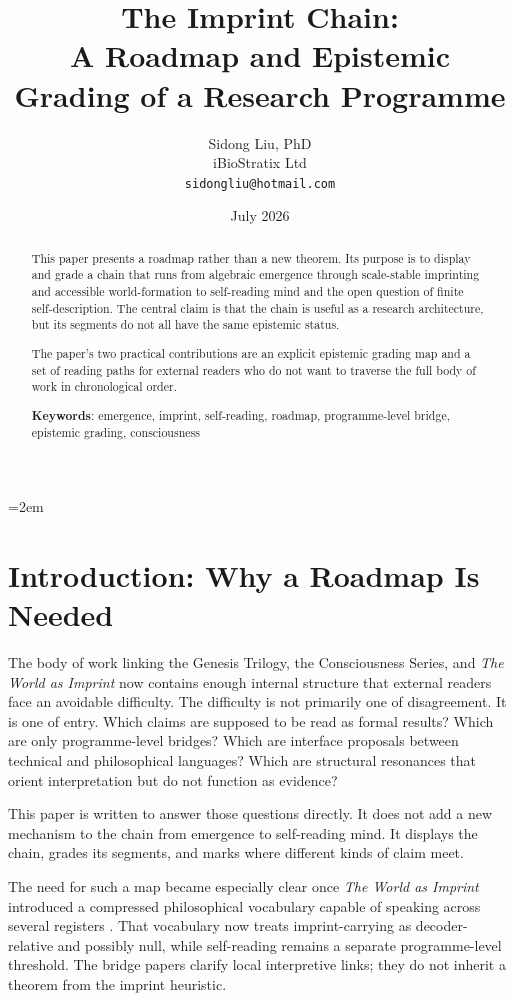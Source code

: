\documentclass[12pt,a4paper]{article}
\title{The Imprint Chain:\\
A Roadmap and Epistemic Grading of a Research Programme}
\author{
  Sidong Liu, PhD \\
  iBioStratix Ltd \\
  \texttt{sidongliu@hotmail.com}
}
\date{July 2026}
\begin{document}
\emergencystretch=2em
\raggedbottom
{}

\maketitle

\begin{abstract}
This paper presents a roadmap rather than a new theorem. Its purpose is to display and grade a chain that runs from algebraic emergence through scale-stable imprinting and accessible world-formation to self-reading mind and the open question of finite self-description. The central claim is that the chain is useful as a research architecture, but its segments do not all have the same epistemic status.

The paper's two practical contributions are an explicit epistemic grading map and a set of reading paths for external readers who do not want to traverse the full body of work in chronological order.

\medskip

\noindent\textbf{Keywords}: emergence, imprint, self-reading, roadmap, programme-level bridge, epistemic grading, consciousness
\end{abstract}

\section{Introduction: Why a Roadmap Is Needed}

The body of work linking the Genesis Trilogy, the Consciousness Series, and \emph{The World as Imprint} now contains enough internal structure that external readers face an avoidable difficulty. The difficulty is not primarily one of disagreement. It is one of entry. Which claims are supposed to be read as formal results? Which are only programme-level bridges? Which are interface proposals between technical and philosophical languages? Which are structural resonances that orient interpretation but do not function as evidence?

This paper is written to answer those questions directly. It does not add a new mechanism to the chain from emergence to self-reading mind. It displays the chain, grades its segments, and marks where different kinds of claim meet.

The need for such a map became especially clear once \emph{The World as
Imprint} introduced a compressed philosophical vocabulary capable of
speaking across several registers \cite{WorldImprint}. That vocabulary
now treats imprint-carrying as decoder-relative and possibly null, while
self-reading remains a separate programme-level threshold. The bridge
papers clarify local interpretive links; they do not inherit a theorem
from the imprint heuristic.
\end{document}
